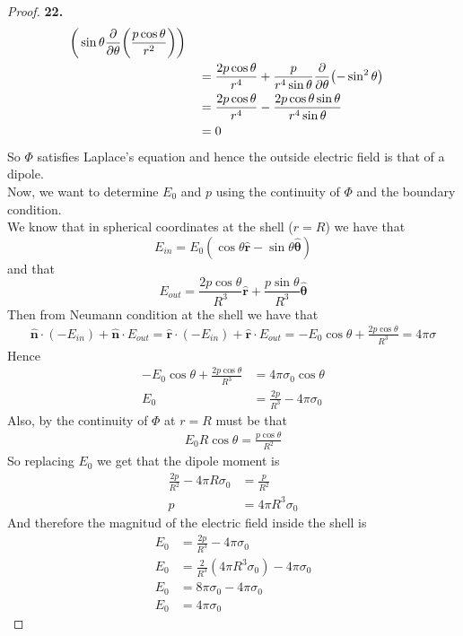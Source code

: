 \documentclass[11pt]{article}
\newcommand{\hatr}{\bm{\hat{r}}}
\newcommand{\hattheta}{\bm{\hat{\theta}}}
\theoremstyle{definition}
\begin{document}
\begin{proof}{\textbf{22.}}
\begin{align*}
    \bigg(\sin\theta\pdv{\theta}(\frac{p\cos\theta}{r^2})\bigg)\\
    &\quad= \frac{2p\cos\theta}{r^4}
    + \frac{p}{r^4\sin\theta}\pdv{\theta}(-\sin^2\theta)\\
    &\quad= \frac{2p\cos\theta}{r^4}
    - \frac{2p\cos\theta\sin\theta}{r^4\sin\theta}\\
    &\quad= 0
\end{align*}
So $\Phi$ satisfies Laplace's equation and hence the outside electric field is
that of a dipole. 
\\
Now, we want to determine $E_0$ and $p$ using the continuity of $\Phi$ and the
boundary condition.
\\
We know that in spherical coordinates at the shell ($r = R$) we have that
$$E_{in} = E_0(\cos\theta\hatr -\sin\theta\hattheta)$$
and that
$$E_{out} = \frac{2p\cos\theta}{R^3}\hatr + \frac{p\sin\theta}{R^3}\hattheta$$
Then from Neumann condition at the shell we have that
\begin{align*}
    \hat{\bm n}\cdot (-E_{in}) + \hat{\bm n}\cdot E_{out}
    = \hatr\cdot (-E_{in}) + \hatr\cdot E_{out}
    = -E_0\cos\theta + \frac{2p\cos\theta}{R^3}
    = 4\pi\sigma
\end{align*}
Hence
\begin{align*}
    -E_0\cos\theta + \frac{2p\cos\theta}{R^3}
    &= 4\pi\sigma_0\cos\theta\\
    E_0 &= \frac{2p}{R^3} - 4\pi\sigma_0
\end{align*}
Also, by the continuity of $\Phi$ at $r = R$ must be that
\begin{align*}
    E_0R\cos\theta = \frac{p\cos\theta}{R^2}
\end{align*}
So replacing $E_0$ we get that the dipole moment is
\begin{align*}
    \frac{2p}{R^2} - 4\pi R\sigma_0 &= \frac{p}{R^2}\\
    p &= 4\pi R^3\sigma_0
\end{align*}
And therefore the magnitud of the electric field inside the shell is
\begin{align*}
    E_0 &= \frac{2p}{R^3} - 4\pi\sigma_0\\
    E_0 &= \frac{2}{R^3}(4\pi R^3\sigma_0) - 4\pi\sigma_0\\
    E_0 &= 8\pi \sigma_0 - 4\pi\sigma_0\\
    E_0 &= 4\pi\sigma_0
\end{align*}
\end{proof}
\end{document}
